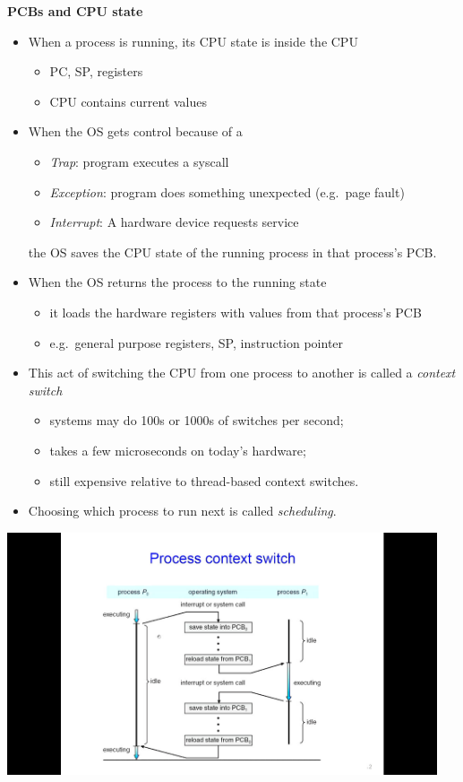 \documentclass[11pt,a4paper]{article}
\begin{document}
\textbf{PCBs and CPU state}
\begin{itemize}
    \item When a process is running, its CPU state is inside the CPU
        \begin{itemize}
            \item PC, SP, registers
            \item CPU contains current values
        \end{itemize}
    \item When the OS gets control because of a
        \begin{itemize}
            \item \emph{Trap}: program executes a syscall
            \item \emph{Exception}: program does something unexpected (e.g.\ page fault)
            \item \emph{Interrupt}: A hardware device requests service
        \end{itemize}
        the OS saves the CPU state of the running process in that process's PCB.\

    \item When the OS returns the process to the running state
        \begin{itemize}
            \item it loads the hardware registers with values from that process's PCB
            \item e.g.\ general purpose registers, SP, instruction pointer
        \end{itemize}
    \item This act of switching the CPU from one process to another is called a
        \emph{context switch}
        \begin{itemize}
            \item systems may do 100s or 1000s of switches per second;
            \item takes a few microseconds on today's hardware;
            \item still expensive relative to thread-based context switches.\
        \end{itemize}
    \item Choosing which process to run next is called \emph{scheduling}.\
\end{itemize}

\includegraphics[height=270]{process-context-switch.jpg}
\end{document}
